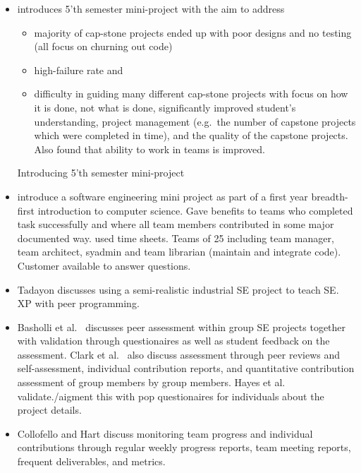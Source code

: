 
\begin{itemize}
  \item \cite{desai_aNovelAproachToCarryingOutMiniProjectInComputerScienceAndEngineering_2012} introduces 5'th semester mini-project with the aim to address
    \begin{itemize}
      \item majority of cap-stone projects ended up with poor designs and no testing (all focus on churning out code)
      \item high-failure rate and
      \item difficulty in guiding many different cap-stone projects with focus on how it is done, not what is done, significantly improved student's understanding, project management (e.g.\ the number of capstone projects which were completed in time),  and the quality of the capstone projects. Also found that ability to work in teams is improved.
    \end{itemize}
    Introducing 5'th semester mini-project
  \item \cite{isaacson_aMiniSoftwareEngineeringProjectForCs0_2003} introduce a software engineering mini project as part of a first year breadth-first introduction to computer science. Gave benefits to teams who completed task successfully and where all team members contributed in some major documented way. used time sheets. Teams of 25 including team manager, team architect, syadmin and team librarian (maintain and integrate code). Customer available to answer questions.
  \item Tadayon \cite{tadayon_softwareEngineeringBasedOnTheTeamSoftwareProcessWithARealWorldProject_2004} discusses using a semi-realistic industrial SE project to teach SE. XP with peer programming.
  \item Basholli et al.\ \cite{basholli_fairAssessmentInSoftwareEngineeringCapstoneProjects_2013} discusses peer assessment within group SE projects together with validation through questionaires as well as student feedback on the assessment. Clark et al.\ \cite{clark_selfAndPeerAssessmentInSoftwareEngineeringProjects_2005} also discuss assessment through peer reviews and self-assessment, individual contribution reports, and quantitative contribution assessment of group members by group members. Hayes et al.\ \cite{hayes_evaluatingIndividualContributionTowardGroupSoftwareEngineeringProjects_2003} validate./aigment this with pop questionaires for individuals about the project details.
  \item Collofello and Hart \cite{collofello_monitoringTeamProgressInASoftwareEngineeringProjectClass_1999} discuss monitoring team progress and individual contributions through regular weekly progress reports, team meeting reports, frequent deliverables, and metrics.

\end{itemize}
